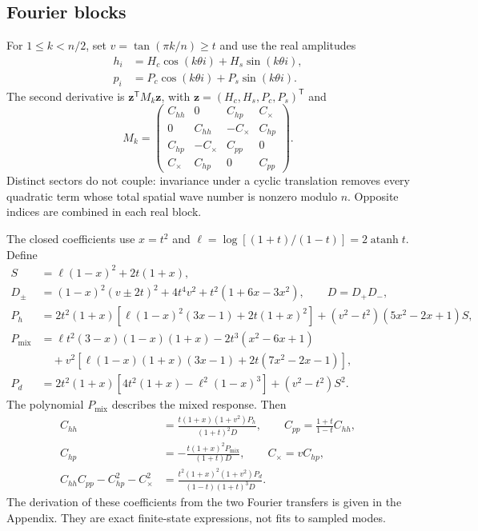 \documentclass[aps,pre,onecolumn,11pt,notitlepage,nofootinbib]{revtex4-2}
\newcommand{\atanh}{\operatorname{atanh}}
\begin{document}
\subsection{Fourier blocks}
For $1\leq k<n/2$, set $v=\tan(\pi k/n)\geq t$ and use the real amplitudes
\begin{align}
 h_i&=H_c\cos(k\theta i)+H_s\sin(k\theta i),\nonumber\\
 p_i&=P_c\cos(k\theta i)+P_s\sin(k\theta i).
\end{align}
The second derivative is $\bm z^{\mathsf T}M_k\bm z$, with $\bm z=(H_c,H_s,P_c,P_s)^{\mathsf T}$ and
\begin{equation}
 M_k=\begin{pmatrix}
 C_{hh}&0&C_{hp}&C_{\times}\\
 0&C_{hh}&-C_{\times}&C_{hp}\\
 C_{hp}&-C_{\times}&C_{pp}&0\\
 C_{\times}&C_{hp}&0&C_{pp}
 \end{pmatrix}.
 \label{eq:block}
\end{equation}
Distinct sectors do not couple: invariance under a cyclic translation removes every quadratic term whose total spatial wave number is nonzero modulo $n$. Opposite indices are combined in each real block.

The closed coefficients use $x=t^2$ and $\ell=\log[(1+t)/(1-t)]=2\atanh t$. Define
\begin{align}
 S&=\ell(1-x)^2+2t(1+x),\label{eq:s}\\
 D_\pm&=(1-x)^2(v\pm2t)^2+4t^4v^2+t^2(1+6x-3x^2),\qquad D=D_+D_-,\label{eq:d}\\
 P_h&=2t^2(1+x)\left[\ell(1-x)^2(3x-1)+2t(1+x)^2\right]
              +(v^2-t^2)(5x^2-2x+1)S,\label{eq:ph}\\
 P_{\mathrm{mix}}&=\ell t^2(3-x)(1-x)(1+x)-2t^3(x^2-6x+1)\nonumber\\
    &\hspace{1em}+v^2\left[\ell(1-x)(1+x)(3x-1)+2t(7x^2-2x-1)\right],\label{eq:pc}\\
 P_d&=2t^2(1+x)\left[4t^2(1+x)-\ell^2(1-x)^3\right]+(v^2-t^2)S^2.\label{eq:pd}
\end{align}
The polynomial $P_{\mathrm{mix}}$ describes the mixed response. Then
\begin{align}
 C_{hh}&=\frac{t(1+x)(1+v^2)P_h}{(1+t)^2D},\qquad
 C_{pp}=\frac{1+t}{1-t}C_{hh},\label{eq:hhpp}\\
 C_{hp}&=-\frac{t(1+x)^2P_{\mathrm{mix}}}{(1+t)D},\qquad C_{\times}=vC_{hp},\label{eq:cross}\\
 C_{hh}C_{pp}-C_{hp}^2-C_{\times}^2
 &=\frac{t^2(1+x)^2(1+v^2)P_d}{(1-t)(1+t)^3D}.\label{eq:det}
\end{align}
The derivation of these coefficients from the two Fourier transfers is given in the Appendix. They are exact finite-state expressions, not fits to sampled modes.
\end{document}

